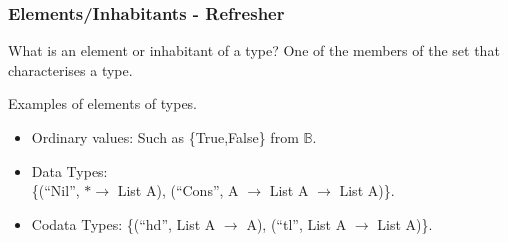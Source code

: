 \documentclass
  [hyperref={colorlinks = true,linkcolor = blue, 
             citecolor = blue, urlcolor = blue}
  ]{beamer}
\begin{document}
\begin{frame}[fragile]
  \frametitle{Elements/Inhabitants - Refresher}
  \begin{block}{What is an element or inhabitant of a type?}
    One of the members of the set that characterises a type.
  \end{block}
  \begin{block}{Examples of elements of types.}
    \begin{itemize}
      \item Ordinary values: Such as \{True,False\} from $\mathbb{B}$.
      \item Data Types:  \\ 
        \{(``Nil'', $\ast \rightarrow$ List A), (``Cons'', A
      $\rightarrow$ List A $\rightarrow$ List A)\}.
      \item Codata Types: \{(``hd'', List A $\rightarrow$ A), (``tl'', List A
      $\rightarrow$ List A)\}.
    \end{itemize}
  \end{block}
\end{frame}
\end{document}
